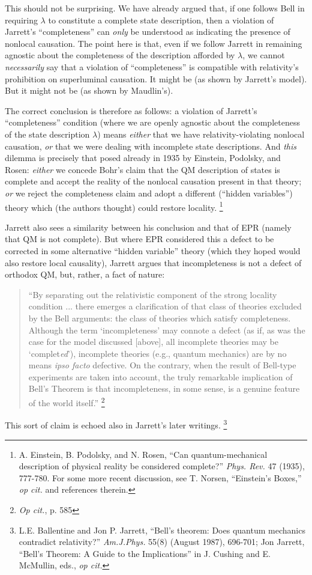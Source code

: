 \documentclass[aps,prc,twocolumn]{revtex4}
\begin{document}
This should not be surprising.  We have already argued that, if one
follows Bell in requiring $\lambda$ to constitute a complete state
description, then a violation of Jarrett's ``completeness'' can \emph{only} be
understood as indicating the presence of nonlocal causation.  The
point here is that, even if we follow Jarrett in remaining agnostic
about the completeness of the description afforded by $\lambda$, we
cannot \emph{necessarily} say that a violation of ``completeness'' is
compatible with relativity's prohibition on superluminal causation.
It might be (as shown by Jarrett's model).  But it might not be (as
shown by Maudlin's).  

The correct conclusion is therefore as follows:  a violation of
Jarrett's ``completeness'' condition (where we are openly agnostic
about the completeness of the state description $\lambda$) means
\emph{either} that we have relativity-violating nonlocal
causation, \emph{or} that we were dealing with incomplete state 
descriptions.  And \emph{this} dilemma is precisely that posed already in
1935 by Einstein, Podolsky, and Rosen:  \emph{either} we concede Bohr's claim
that the QM description of states is complete and accept the reality
of the nonlocal causation present in that theory; \emph{or} we reject the
completeness claim and adopt a different (``hidden variables'') theory
which (the authors thought) could restore locality.
\footnote{A. Einstein, B. Podolsky, and N. Rosen, ``Can
  quantum-mechanical description of physical reality be considered 
  complete?'' \emph{Phys. Rev.} 47 (1935), 777-780.  For some more
  recent discussion, see T. Norsen, ``Einstein's Boxes,'' \emph{op
    cit.} and references therein.}


Jarrett also sees a similarity between his conclusion and that of EPR
(namely that QM is not complete).  But where EPR considered this a
defect to be corrected in some alternative ``hidden variable'' theory
(which they hoped would also restore local causality), Jarrett argues
that incompleteness is not a defect of orthodox QM, but, rather, a
fact of nature:  
\begin{quote}
``By separating out the relativistic component of the
strong locality condition ... there emerges a clarification of that
class of theories excluded by the Bell arguments:  the class of
theories which satisfy completeness.  Although the term
`incompleteness' may connote a defect (as if, as was the case for the
model discussed [above], all incomplete theories may be
`complet\emph{ed}'), incomplete theories (e.g., quantum mechanics) are
by no means \emph{ipso facto} defective.  On the contrary, when the
result of Bell-type experiments are taken into account, the truly
remarkable implication of Bell's Theorem is that incompleteness, in
some sense, is a genuine feature of the world itself.''
\footnote{\emph{Op cit.}, p. 585}
\end{quote}
This sort of claim is echoed also in Jarrett's later writings. 
\footnote{L.E. Ballentine and Jon P. Jarrett, 
``Bell's theorem:  Does quantum mechanics contradict relativity?'' 
\emph{Am.J.Phys.} 55(8) (August 1987), 696-701; Jon Jarrett, ``Bell's
Theorem:  A Guide to the Implications'' in J. Cushing and E. McMullin,
eds., \emph{op cit.}}
\end{document}
